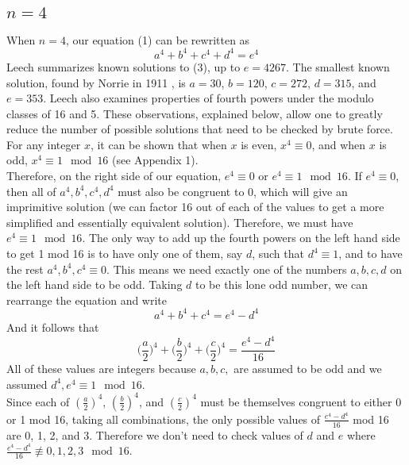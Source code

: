 \documentclass{article}
\begin{document}
\begin{flushleft}
\subsection{$n=4$}
When $n=4$, our equation (1) can be rewritten as 
\begin{equation}
    a^4+b^4+c^4+d^4=e^4
\end{equation}
Leech \cite{leech} summarizes known solutions to (3), up to $e=4267$. The smallest known solution, found by Norrie in 1911 \cite{leech}, is $a=30$, 
$b=120$, $c=272$, $d=315$, and $e=353$. Leech also examines properties of fourth powers under the modulo classes of 16 and 5. These observations, explained below, allow one to greatly reduce the number of possible solutions that need to be checked by brute force. \\
\vspace{.1in}
For any integer $x$, it can be shown that when $x$ is even, $x^4 \equiv 0$, and when $x$ is odd, $x^4 \equiv 1 \mod 16$ (see Appendix 1).   \\
\vspace{.1in}
Therefore, on the right side of our equation, $e^4 \equiv 0$ or $e^4 \equiv 1 \mod 16$. If $e^4 \equiv 0$, then all of $a^4, b^4, c^4, d^4$ must also be congruent to 0, which will give an imprimitive solution (we can factor 16 out of each of the values to get a more simplified and essentially equivalent solution). Therefore, we must have $e^4 \equiv 1 \mod 16$. The only way to add up the fourth powers on the left hand side to get 1 mod 16 is to have only one of them, say $d$, such that $d^4 \equiv 1$, and to have the rest $a^4, b^4, c^4 \equiv 0$. This means we need exactly one of the numbers $a, b, c, d$ on the left hand side to be odd. Taking $d$ to be this lone odd number, we can rearrange the equation and write 
\begin{equation*}
    a^4+b^4+c^4=e^4-d^4
\end{equation*}
And it follows that 
\begin{equation*}
    \Big(\frac{a}{2}\Big)^4 +  \Big(\frac{b}{2}\Big)^4 +  \Big(\frac{c}{2}\Big)^4 = \frac{e^4-d^4}{16}
\end{equation*}
All of these values are integers because $a, b, c,$ are assumed to be odd and we assumed $d^4, e^4 \equiv 1 \mod 16$. \\
\vspace{.1in}
Since each of $(\frac{a}{2})^4$, $(\frac{b}{2})^4$, and $(\frac{c}{2})^4$ must be themselves congruent to either 0 or 1 mod 16, taking all combinations, the only possible values of $ \frac{e^4-d^4}{16}$ mod 16 are 0, 1, 2, and 3. Therefore we don't need to check values of $d$ and $e$ where $ \frac{e^4-d^4}{16} \not\equiv 0, 1, 2, 3 \mod 16$. \\

\end{flushleft}
\end{document}
